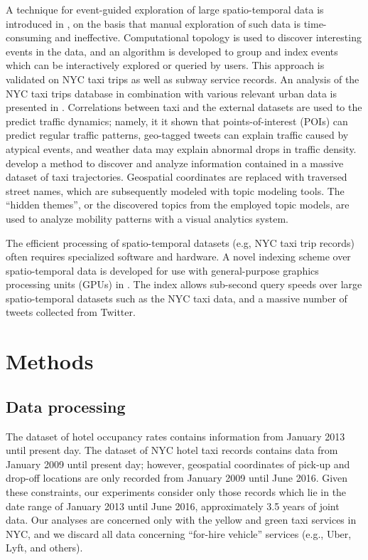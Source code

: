 \documentclass[useAMS, referee, usenatbib]{biom}
\begin{document}
A technique for event-guided exploration of large spatio-temporal data is introduced in \citet{Doraiswamy2014UsingTA}, on the basis that manual exploration of such data is time-consuming and ineffective. Computational topology is used to discover interesting events in the data, and an algorithm is developed to group and index events which can be interactively explored or queried by users. This approach is validated on NYC taxi trips as well as subway service records. An analysis of the NYC taxi trips database in combination with various relevant urban data is presented in \citet{Wu2016InterpretingTD}. Correlations between taxi and the external datasets are used to the predict traffic dynamics; namely, it it shown that points-of-interest (POIs) can predict regular traffic patterns, geo-tagged tweets can explain traffic caused by atypical events, and weather data may explain abnormal drops in traffic density. \citet{Chu2014VisualizingHT} develop a method to discover and analyze information contained in a massive dataset of taxi trajectories. Geospatial coordinates are replaced with traversed street names, which are subsequently modeled with topic modeling tools. The ``hidden themes'', or the discovered topics from the employed topic models, are used to analyze mobility patterns with a visual analytics system. 

The efficient processing of spatio-temporal datasets (e.g, NYC taxi trip records) often requires specialized software and hardware. A novel indexing scheme over spatio-temporal data is developed for use with general-purpose graphics processing units (GPUs) in \citet{Doraiswamy2016AGI}. The index allows sub-second query speeds over large spatio-temporal datasets such as the NYC taxi data, and a massive number of tweets collected from Twitter.

\section{Methods}
\label{s:methods}

\subsection{Data processing}

The dataset of hotel occupancy rates contains information from January 2013 until present day. The dataset of NYC hotel taxi records contains data from January 2009 until present day; however, geospatial coordinates of pick-up and drop-off locations are only recorded from January 2009 until June 2016. Given these constraints, our experiments consider only those records which lie in the date range of January 2013 until June 2016, approximately 3.5 years of joint data. Our analyses are concerned only with the yellow and green taxi services in NYC, and we discard all data concerning ``for-hire vehicle'' services (e.g., Uber, Lyft, and others).
\end{document}

